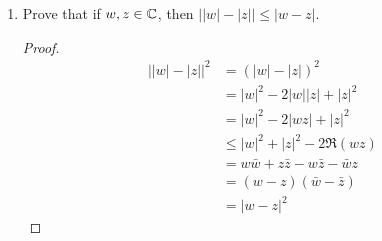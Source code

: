 \begin{enumerate}
\begin{enumerate}
\begin{proof}
        \end{proof}
        \item $|\operatorname{Re} z| \le |z|$ and $|\operatorname{Im} z| \le |z|$
        \begin{proof}
            $|z| = \sqrt{(\Re z)^2 + (\Im z)^2}$. Since $x^2$ is always greater or equal to zero, we have that $|\Re z| \leq |z|$ and $|\Im z| \leq |z|$.
        \end{proof}
        \item $|\bar{z}| = |z|$
        \begin{proof}
            \begin{align*}
                |z| &= \sqrt{(\Re z)^2 + (\Im z)^2} \\
                &= \sqrt{(\Re z)^2 + (-\Im z)^2} \\
                &= |\bar z|
            \end{align*}
        \end{proof}
        \item $|wz| = |w||z|$
        \begin{proof}

            \begin{align*}
                |wz| &= \sqrt{(\Re wz)^2 + (\Im wz)^2} \\
                &= \sqrt{(ac - bd)^2 + (ad + bc)^2} \\
                &= \sqrt{(ac)^2 - 2abcd + (bd)^2 + (ad)^2 + 2abcd + (bc)^2} \\
                &= \sqrt{(ab)^2 + (ac)^2 + (bc)^2 + (bd)^2} \\
                &= \sqrt{(a^2 + b^2)(c^2 + d^2)} \\
                &= \sqrt{((\Re w)^2 + (\Im w)^2)((\Re z)^2 + (\Im z)^2)} \\
                &= \sqrt{(\Re w)^2 + (\Im w)^2}\sqrt{(\Re z)^2 + (\Im z)^2} \\
                &= |w||z|
            \end{align*}
        \end{proof}
    
    \end{enumerate}


        \item[2] Prove that if $w, z \in \mathbb{C}$, then $\bigl||w| - |z|\bigr| \leq |w - z|$.
        
        \begin{proof}
            \begin{align*}
                \bigl||w| - |z|\bigr|^2 &= (|w| - |z|)^2 \\
                &= |w|^2 - 2|w||z| + |z|^2 \\
                &= |w|^2 - 2|wz| + |z|^2 \\
                &\leq |w|^2 + |z|^2 - 2\Re(wz) \\
                &= w\bar w + z \bar z - w \bar z - \bar w z \\
                &= (w - z)(\bar w - \bar z) \\
                &= |w - z|^2
            \end{align*}


\end{proof}
\end{enumerate}
